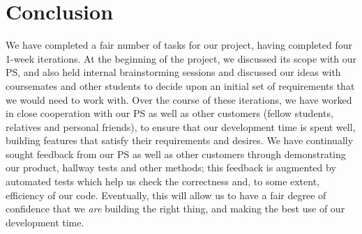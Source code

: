 \documentclass[a4paper, 10pt]{article}
\begin{document}
\section{Conclusion}
We have completed a fair number of tasks for our project, having completed four 1-week iterations. At the beginning of the project, we discussed its scope with our PS, and also held internal brainstorming sessions and discussed our ideas with coursemates and other students to decide upon an initial set of requirements that we would need to work with. Over the course of these iterations, we have worked in close cooperation with our PS as well as other customers (fellow students, relatives and personal friends), to ensure that our development time is spent well, building features that satisfy their requirements and desires. We have continually sought feedback from our PS as well as other customers through demonstrating our product, hallway tests and other methods; this feedback is augmented by automated tests which help us check the correctness and, to some extent, efficiency of our code. Eventually, this will allow us to have a fair degree of confidence that we \textit{are} building the right thing, and making the best use of our development time.

\newpage
\end{document}
